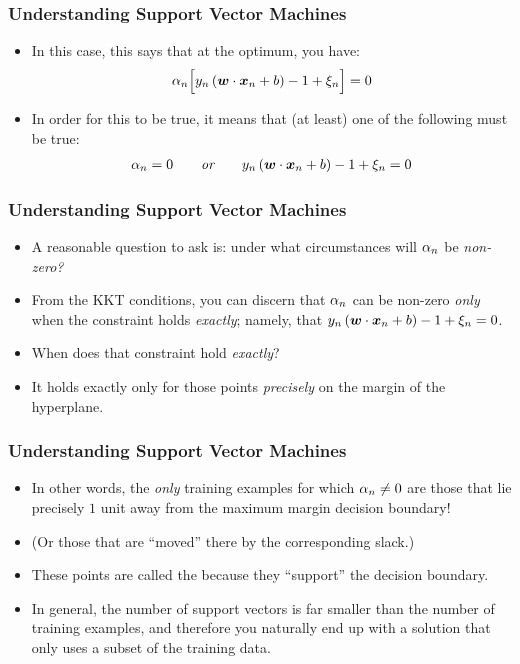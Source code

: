 \documentclass[trans]{beamer}
\begin{document}
\begin{frame}
  \frametitle{Understanding Support Vector Machines}
\begin{itemize}
\item 
 In this case, this says that at the
optimum, you have:
%
\begin{align}
  \alpha_n \Big[ y_n \left( {\boldsymbol{w}} \cdot {\boldsymbol{x}}_n + b \right) - 1 + \xi_n \Big] = 0
\end{align}
%
\item In order for this to be true, it means that (at least) one of the
following must be true:
%
\begin{align}
  \alpha_n = 0 \qquad{\textit{or}}\qquad
  y_n \left( {\boldsymbol{w}} \cdot {\boldsymbol{x}}_n + b \right) - 1 + \xi_n = 0
\end{align}
%
\end{itemize}
\end{frame}

\begin{frame}
  \frametitle{Understanding Support Vector Machines}
\begin{itemize}
\item 
A reasonable question to ask is: under what circumstances will $\alpha_n$
be \emph{non-zero?}  
\item From the KKT conditions, you can discern that
$\alpha_n$ can be non-zero \emph{only} when the constraint holds
\emph{exactly}; namely, that $y_n \left( {\boldsymbol{w}} \cdot {\boldsymbol{x}}_n + b \right)
- 1 + \xi_n = 0$.
\item  When does that constraint hold \emph{exactly}? 
\item It
holds exactly only for those points \emph{precisely} on the margin of
the hyperplane.
\end{itemize}
\end{frame}

\begin{frame}
  \frametitle{Understanding Support Vector Machines}
\begin{itemize}
\item 
In other words, the \emph{only} training examples for which $\alpha_n
\neq 0$ are those that lie precisely $1$ unit away from the maximum
margin decision boundary! 
\item (Or those that are ``moved'' there by the
corresponding slack.) 
\item These points are called the  because they ``support'' the decision boundary. 
  \item In
general, the number of support vectors is far smaller than the number
of training examples, and therefore you naturally end up with a
solution that only uses a subset of the training data.
\end{itemize}
\end{frame}
\end{document}

